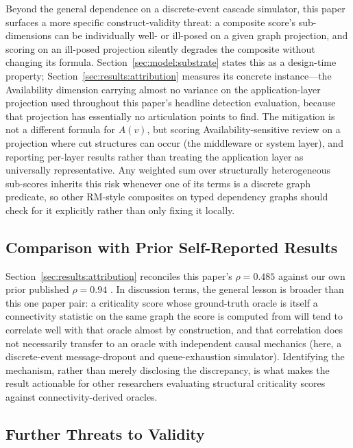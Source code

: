 Beyond the general dependence on a discrete-event cascade simulator, this paper surfaces a more specific construct-validity threat: a composite score's sub-dimensions can be individually well- or ill-posed on a given graph projection, and scoring on an ill-posed projection silently degrades the composite without changing its formula. Section~\ref{sec:model:substrate} states this as a design-time property; Section~\ref{sec:results:attribution} measures its concrete instance---the Availability dimension carrying almost no variance on the application-layer projection used throughout this paper's headline detection evaluation, because that projection has essentially no articulation points to find. The mitigation is not a different formula for $A(v)$, but scoring Availability-sensitive review on a projection where cut structures can occur (the middleware or system layer), and reporting per-layer results rather than treating the application layer as universally representative. Any weighted sum over structurally heterogeneous sub-scores inherits this risk whenever one of its terms is a discrete graph predicate, so other RM-style composites on typed dependency graphs should check for it explicitly rather than only fixing it locally.

\subsection{Comparison with Prior Self-Reported Results}
\label{sec:disc:prior_results}

Section~\ref{sec:results:attribution} reconciles this paper's $\rho = 0.485$ against our own prior published $\rho = 0.94$ \citep{yigit2025graph}. In discussion terms, the general lesson is broader than this one paper pair: a criticality score whose ground-truth oracle is itself a connectivity statistic on the same graph the score is computed from will tend to correlate well with that oracle almost by construction, and that correlation does not necessarily transfer to an oracle with independent causal mechanics (here, a discrete-event message-dropout and queue-exhaustion simulator). Identifying the mechanism, rather than merely disclosing the discrepancy, is what makes the result actionable for other researchers evaluating structural criticality scores against connectivity-derived oracles.

\subsection{Further Threats to Validity}
\label{sec:disc:threats}

